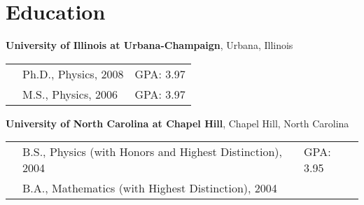 \section{\sc Education } %
{\bf University of Illinois at Urbana-Champaign}, Urbana, Illinois\\
\vspace*{-.15in}
\begin{tabular}{@{}p{0.4in}p{4.8in}p{1.8in}}
&Ph.D., Physics, 2008 &GPA: 3.97\\
&M.S., Physics, 2006 &GPA: 3.97\\
\end{tabular}

{\bf University of North Carolina at Chapel Hill}, Chapel Hill, North Carolina\\
\vspace*{-.15in}
\begin{tabular}{@{}p{0.4in}p{4.8in}p{1.8in}}
&B.S., Physics (with Honors and Highest Distinction), 2004 &GPA: 3.95\\
&B.A., Mathematics (with Highest Distinction), 2004\\
\end{tabular}
\vspace*{0.05in}

